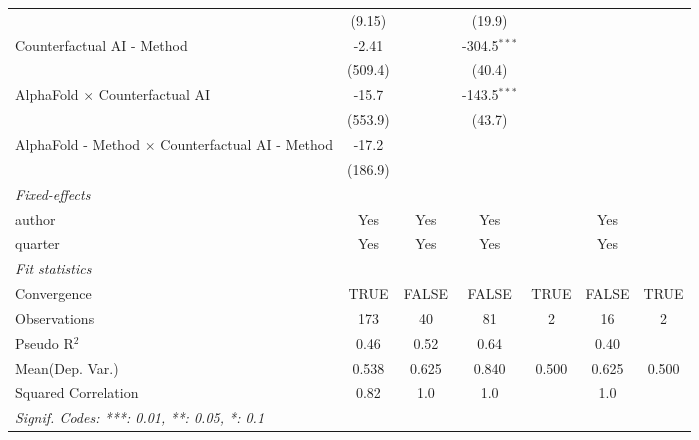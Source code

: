 \begin{tabular}{lcccccc}
                                                           & (9.15)    &              & (19.9)         &      &         &   \\   
   Counterfactual AI - Method                              & -2.41     &              & -304.5$^{***}$ &      &         &   \\   
                                                           & (509.4)   &              & (40.4)         &      &         &   \\   
   AlphaFold $\times$ Counterfactual AI                    & -15.7     &              & -143.5$^{***}$ &      &         &   \\   
                                                           & (553.9)   &              & (43.7)         &      &         &   \\   
   AlphaFold - Method $\times$ Counterfactual AI - Method  & -17.2     &              &                &      &         &   \\   
                                                           & (186.9)   &              &                &      &         &   \\   
   \midrule
   \emph{Fixed-effects}\\
   author                                                  & Yes       & Yes          & Yes            &      & Yes     & \\  
   quarter                                                 & Yes       & Yes          & Yes            &      & Yes     & \\  
   \midrule
   \emph{Fit statistics}\\
   Convergence                                             &TRUE       & FALSE        & FALSE          & TRUE & FALSE   & TRUE\\  
   Observations                                            & 173       & 40           & 81             & 2    & 16      & 2\\  
   Pseudo R$^2$                                            & 0.46      & 0.52         & 0.64           &      & 0.40    & \\  
Mean(Dep. Var.) & 0.538 & 0.625 & 0.840 & 0.500 & 0.625 & 0.500 \\
   Squared Correlation                                     & 0.82      & 1.0          & 1.0            &      & 1.0     & \\  
   \midrule \midrule
   \multicolumn{7}{l}{\emph{Signif. Codes: ***: 0.01, **: 0.05, *: 0.1}}\\
\end{tabular}
\par\endgroup
